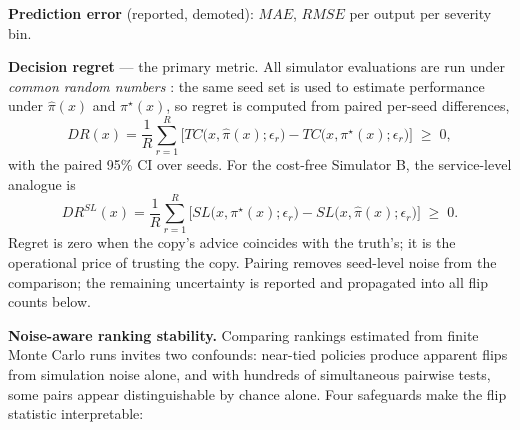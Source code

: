 \documentclass[12pt,a4paper]{article}
\begin{document}
\textbf{Prediction error} (reported, demoted): $MAE$, $RMSE$ per output per severity bin.

\textbf{Decision regret} --- the primary metric. All simulator evaluations are run under \emph{common random numbers} \citep{law2015}: the same seed set is used to estimate performance under $\hat{\pi}(x)$ and $\pi^{\star}(x)$, so regret is computed from paired per-seed differences,
\begin{equation}
DR(x) = \frac{1}{R}\sum_{r=1}^{R}\Big[ TC\big(x,\hat{\pi}(x);\epsilon_r\big) - TC\big(x,\pi^{\star}(x);\epsilon_r\big) \Big] \;\geq\; 0,
\end{equation}
with the paired 95\% CI over seeds. For the cost-free Simulator B, the service-level analogue is
\begin{equation}
DR^{SL}(x) = \frac{1}{R}\sum_{r=1}^{R}\Big[ SL\big(x,\pi^{\star}(x);\epsilon_r\big) - SL\big(x,\hat{\pi}(x);\epsilon_r\big) \Big] \;\geq\; 0.
\end{equation}
Regret is zero when the copy's advice coincides with the truth's; it is the operational price of trusting the copy. Pairing removes seed-level noise from the comparison; the remaining uncertainty is reported and propagated into all flip counts below.

\textbf{Noise-aware ranking stability.} Comparing rankings estimated from finite Monte Carlo runs invites two confounds: near-tied policies produce apparent flips from simulation noise alone, and with hundreds of simultaneous pairwise tests, some pairs appear distinguishable by chance alone. Four safeguards make the flip statistic interpretable:
\end{document}
